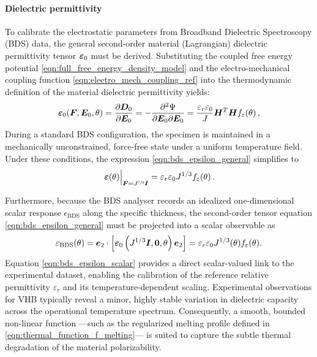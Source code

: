 \paragraph{Dielectric permittivity}
To calibrate the electrostatic parameters from Broadband Dielectric Spectroscopy (BDS) data, the general second-order material (Lagrangian) dielectric permittivity tensor $\boldsymbol{\varepsilon}_0$ must be derived. Substituting the coupled free energy potential \eqref{eqn:full_free_energy_density_model} and the electro-mechanical coupling function \eqref{eqn:electro_mech_coupling_ref} into the thermodynamic definition of the material dielectric permittivity yields:
%
\begin{equation} \label{eqn:bds_epsilon_general}
    \boldsymbol{\varepsilon}_0(\boldsymbol{F}, \boldsymbol{E}_0, \theta) =
    \frac{\partial \boldsymbol{D}_0}{\partial \boldsymbol{E}_0} =
    -\frac{\partial^2 \Psi}{\partial \boldsymbol{E}_0 \partial \boldsymbol{E}_0} =
    \frac{\varepsilon_r\varepsilon_0}{J} \boldsymbol{H}^{T}\boldsymbol{H} f_{\varepsilon}(\theta) \,,
\end{equation}
%
During a standard BDS configuration, the specimen is maintained in a mechanically unconstrained, force-free state under a uniform temperature field. Under these conditions, the expression \eqref{eqn:bds_epsilon_general} simplifies to
\begin{equation}
  \left.\vect{\varepsilon}(\theta)\vphantom{a_{\substack{a\\a}}}\right|_{\F=J^{\sfrac{1}{3}}\I}
    = \varepsilon_r\varepsilon_0 J^{1/3} f_{\varepsilon}(\theta) \,.
\end{equation}

Furthermore, because the BDS analyser records an idealized one-dimensional scalar response $\epsilon_{\text{BDS}}$ along the specific thickness, the second-order tensor equation \eqref{eqn:bds_epsilon_general} must be projected into a scalar observable as
%
\begin{equation} \label{eqn:bds_epsilon_scalar}
    \varepsilon_{\text{BDS}}(\theta) = \boldsymbol{e}_2 \cdot \left[ \boldsymbol{\varepsilon}_0\left(J^{1/3}\boldsymbol{I}, \boldsymbol{0}, \theta\right) \boldsymbol{e}_2 \right] = \varepsilon_r\varepsilon_0 J^{1/3}(\theta) f_{\varepsilon}(\theta).
\end{equation}
%
Equation \eqref{eqn:bds_epsilon_scalar} provides a direct scalar-valued link to the experimental dataset, enabling the calibration of the reference relative permittivity $\varepsilon_r$ and its temperature-dependent scaling. Experimental observations for VHB typically reveal a minor, highly stable variation in dielectric capacity across the operational temperature spectrum. Consequently, a smooth, bounded non-linear function —such as the regularized melting profile defined in \eqref{eqn:thermal_function_f_melting}— is suited to capture the subtle thermal degradation of the material polarizability.



